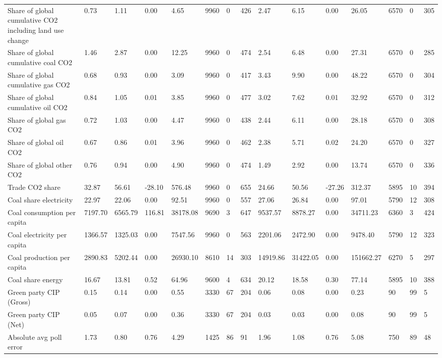 \begin{longtable}{lllllllllllllll}
Share of global cumulative CO2 including land use change & 0.73 & 1.11 & 0.00 & 4.65 & 9960 & 0 & 426 & 2.47 & 6.15 & 0.00 & 26.05 & 6570 & 0 & 305\\
Share of global cumulative coal CO2 & 1.46 & 2.87 & 0.00 & 12.25 & 9960 & 0 & 474 & 2.54 & 6.48 & 0.00 & 27.31 & 6570 & 0 & 285\\
Share of global cumulative gas CO2 & 0.68 & 0.93 & 0.00 & 3.09 & 9960 & 0 & 417 & 3.43 & 9.90 & 0.00 & 48.22 & 6570 & 0 & 304\\
Share of global cumulative oil CO2 & 0.84 & 1.05 & 0.01 & 3.85 & 9960 & 0 & 477 & 3.02 & 7.62 & 0.01 & 32.92 & 6570 & 0 & 312\\
\addlinespace
Share of global gas CO2 & 0.72 & 1.03 & 0.00 & 4.47 & 9960 & 0 & 438 & 2.44 & 6.11 & 0.00 & 28.18 & 6570 & 0 & 308\\
Share of global oil CO2 & 0.67 & 0.86 & 0.01 & 3.96 & 9960 & 0 & 462 & 2.38 & 5.71 & 0.02 & 24.20 & 6570 & 0 & 327\\
Share of global other CO2 & 0.76 & 0.94 & 0.00 & 4.90 & 9960 & 0 & 474 & 1.49 & 2.92 & 0.00 & 13.74 & 6570 & 0 & 336\\
Trade CO2 share & 32.87 & 56.61 & -28.10 & 576.48 & 9960 & 0 & 655 & 24.66 & 50.56 & -27.26 & 312.37 & 5895 & 10 & 394\\
Coal share electricity & 22.97 & 22.06 & 0.00 & 92.51 & 9960 & 0 & 557 & 27.06 & 26.84 & 0.00 & 97.01 & 5790 & 12 & 308\\
\addlinespace
Coal consumption per capita & 7197.70 & 6565.79 & 116.81 & 38178.08 & 9690 & 3 & 647 & 9537.57 & 8878.27 & 0.00 & 34711.23 & 6360 & 3 & 424\\
Coal electricity per capita & 1366.57 & 1325.03 & 0.00 & 7547.56 & 9960 & 0 & 563 & 2201.06 & 2472.90 & 0.00 & 9478.40 & 5790 & 12 & 323\\
Coal production per capita & 2890.83 & 5202.44 & 0.00 & 26930.10 & 8610 & 14 & 303 & 14919.86 & 31422.05 & 0.00 & 151662.27 & 6270 & 5 & 297\\
Coal share energy & 16.67 & 13.81 & 0.52 & 64.96 & 9600 & 4 & 634 & 20.12 & 18.58 & 0.30 & 77.14 & 5895 & 10 & 388\\
Green party CIP (Gross) & 0.15 & 0.14 & 0.00 & 0.55 & 3330 & 67 & 204 & 0.06 & 0.08 & 0.00 & 0.23 & 90 & 99 & 5\\
\addlinespace
Green party CIP (Net) & 0.05 & 0.07 & 0.00 & 0.36 & 3330 & 67 & 204 & 0.03 & 0.03 & 0.00 & 0.08 & 90 & 99 & 5\\
Absolute avg poll error & 1.73 & 0.80 & 0.76 & 4.29 & 1425 & 86 & 91 & 1.96 & 1.08 & 0.76 & 5.08 & 750 & 89 & 48\\

\end{longtable}
